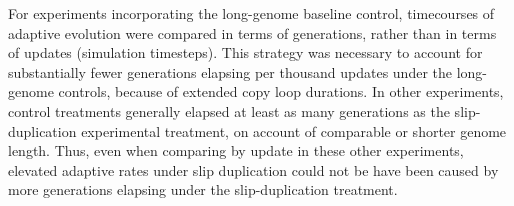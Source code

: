For experiments incorporating the long-genome baseline control, timecourses of adaptive evolution were compared in terms of generations, rather than in terms of updates (simulation timesteps).
This strategy was necessary to account for substantially fewer generations elapsing per thousand updates under the long-genome controls, because of extended copy loop durations.
In other experiments, control treatments generally elapsed at least as many generations as the slip-duplication experimental treatment, on account of comparable or shorter genome length.
Thus, even when comparing by update in these other experiments, elevated adaptive rates under slip duplication could not be have been caused by more generations elapsing under the slip-duplication treatment.




